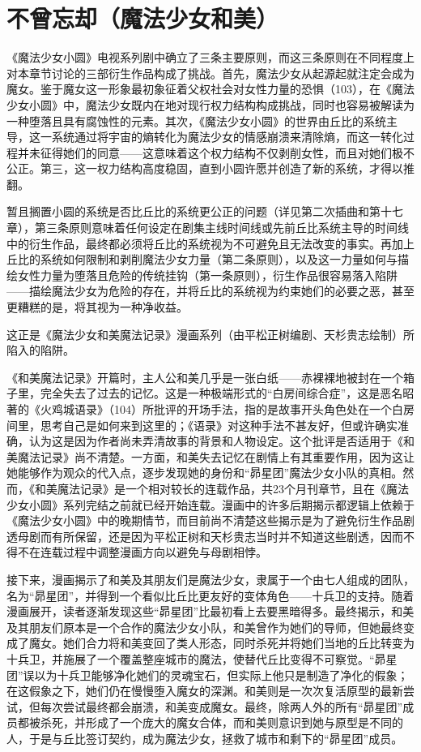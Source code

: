 \chapter{不曾忘却（魔法少女和美）}
《魔法少女小圆》电视系列剧中确立了三条主要原则，而这三条原则在不同程度上对本章节讨论的三部衍生作品构成了挑战。首先，魔法少女从起源起就注定会成为魔女。鉴于魔女这一形象最初象征着父权社会对女性力量的恐惧（103），在《魔法少女小圆》中，魔法少女既内在地对现行权力结构构成挑战，同时也容易被解读为一种堕落且具有腐蚀性的元素。其次，《魔法少女小圆》的世界由丘比的系统主导，这一系统通过将宇宙的熵转化为魔法少女的情感崩溃来清除熵，而这一转化过程并未征得她们的同意——这意味着这个权力结构不仅剥削女性，而且对她们极不公正。第三，这一权力结构高度稳固，直到小圆许愿并创造了新的系统，才得以推翻。

暂且搁置小圆的系统是否比丘比的系统更公正的问题（详见第二次插曲和第十七章），第三条原则意味着任何设定在剧集主线时间线或先前丘比系统主导的时间线中的衍生作品，最终都必须将丘比的系统视为不可避免且无法改变的事实。再加上丘比的系统如何限制和剥削魔法少女力量（第二条原则），以及这一力量如何与描绘女性力量为堕落且危险的传统挂钩（第一条原则），衍生作品很容易落入陷阱——描绘魔法少女为危险的存在，并将丘比的系统视为约束她们的必要之恶，甚至更糟糕的是，将其视为一种净收益。

这正是《魔法少女和美魔法记录》漫画系列（由平松正树编剧、天杉贵志绘制）所陷入的陷阱。

《和美魔法记录》开篇时，主人公和美几乎是一张白纸——赤裸裸地被封在一个箱子里，完全失去了过去的记忆。这是一种极端形式的“白房间综合症”，这是恶名昭著的《火鸡城语录》（104）所批评的开场手法，指的是故事开头角色处在一个白房间里，思考自己是如何来到这里的；《语录》对这种手法不甚友好，但或许确实准确，认为这是因为作者尚未弄清故事的背景和人物设定。这个批评是否适用于《和美魔法记录》尚不清楚。一方面，和美失去记忆在剧情上有其重要作用，因为这让她能够作为观众的代入点，逐步发现她的身份和“昴星团”魔法少女小队的真相。然而，《和美魔法记录》是一个相对较长的连载作品，共23个月刊章节，且在《魔法少女小圆》系列完结之前就已经开始连载。漫画中的许多后期揭示都逻辑上依赖于《魔法少女小圆》中的晚期情节，而目前尚不清楚这些揭示是为了避免衍生作品剧透母剧而有所保留，还是因为平松正树和天杉贵志当时并不知道这些剧透，因而不得不在连载过程中调整漫画方向以避免与母剧相悖。

接下来，漫画揭示了和美及其朋友们是魔法少女，隶属于一个由七人组成的团队，名为“昴星团”，并得到一个看似比丘比更友好的变体角色——十兵卫的支持。随着漫画展开，读者逐渐发现这些“昴星团”比最初看上去要黑暗得多。最终揭示，和美及其朋友们原本是一个合作的魔法少女小队，和美曾作为她们的导师，但她最终变成了魔女。她们合力将和美变回了类人形态，同时杀死并将她们当地的丘比转变为十兵卫，并施展了一个覆盖整座城市的魔法，使替代丘比变得不可察觉。“昴星团”误以为十兵卫能够净化她们的灵魂宝石，但实际上他只是制造了净化的假象；在这假象之下，她们仍在慢慢堕入魔女的深渊。和美则是一次次复活原型的最新尝试，但每次尝试最终都会崩溃，和美变成魔女。最终，除两人外的所有“昴星团”成员都被杀死，并形成了一个庞大的魔女合体，而和美则意识到她与原型是不同的人，于是与丘比签订契约，成为魔法少女，拯救了城市和剩下的“昴星团”成员。

